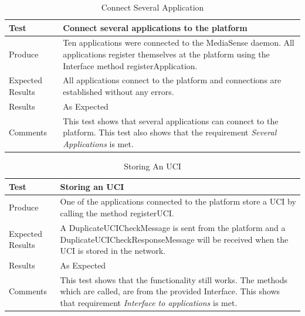 \begin{table}[!h]
    \begin{tabular}{ | l | p{12cm} |}
    \hline
    Test 	 				& 		 Connect several applications to the platform\\ \hline
	Produce  				& 		 Ten applications were connected to the MediaSense daemon. All applications register themselves at the platform using the Interface method registerApplication.\\ \hline
	Expected Results  		& 		 All applications connect to the platform and connections are established without any errors.\\ \hline
	Results 				& 		 As Expected\\ \hline
	Comments				& 		 This test shows that several applications can connect to the platform. This test also shows that the requirement \emph{Several Applications} is met.\\ \hline
    \end{tabular}
    \caption{Connect Several Application}
\end{table}

\begin{table}[!h]
    \begin{tabular}{ | l | p{12cm} |}
    \hline
    Test 	 				& 		 Storing an UCI\\ \hline
	Produce  				& 		 One of the applications connected to the platform store a UCI by calling the method registerUCI.\\ \hline
	Expected Results  		& 		 A DuplicateUCICheckMessage is sent from the platform and a DuplicateUCICheckResponseMessage will be received when the UCI is stored in the network.\\ \hline
	Results 				& 		 As Expected\\ \hline
	Comments				& 		 This test shows that the functionality still works. The methods which are called, are from the provided Interface. This shows that requirement \emph{Interface to applications} is met.\\ \hline
    \end{tabular}
    \caption{Storing An UCI}
\end{table}

